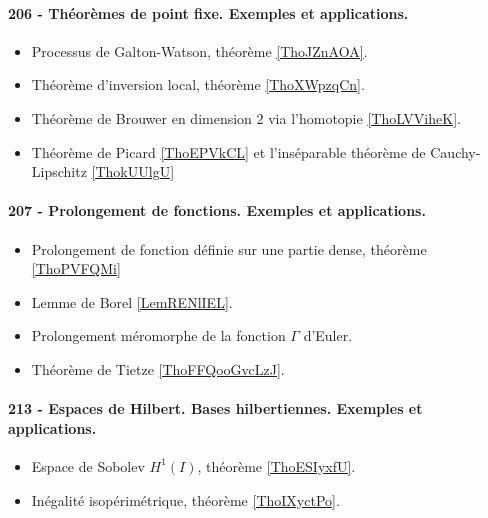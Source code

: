 \paragraph{206 - Théorèmes de point fixe. Exemples et applications.}
\begin{itemize}
    \item Processus de Galton-Watson, théorème \ref{ThoJZnAOA}.
    \item Théorème d'inversion local, théorème \ref{ThoXWpzqCn}.
    \item Théorème de Brouwer en dimension \( 2\) via l'homotopie \ref{ThoLVViheK}.
    \item Théorème de Picard \ref{ThoEPVkCL} et l'inséparable théorème de Cauchy-Lipschitz \ref{ThokUUlgU}
\end{itemize}
\paragraph{207 - Prolongement de fonctions. Exemples et applications.}
\begin{itemize}
    \item Prolongement de fonction définie sur une partie dense, théorème \ref{ThoPVFQMi}
    \item Lemme de Borel \ref{LemRENlIEL}.
    \item Prolongement méromorphe de la fonction \( \Gamma\) d'Euler.
    \item Théorème de Tietze \ref{ThoFFQooGvcLzJ}.
\end{itemize}
\paragraph{213 - Espaces de Hilbert. Bases hilbertiennes. Exemples et applications.}
\begin{itemize}
    \item Espace de Sobolev \( H^1(I)\), théorème \ref{ThoESIyxfU}.
    \item Inégalité isopérimétrique, théorème \ref{ThoIXyctPo}.
\end{itemize}
